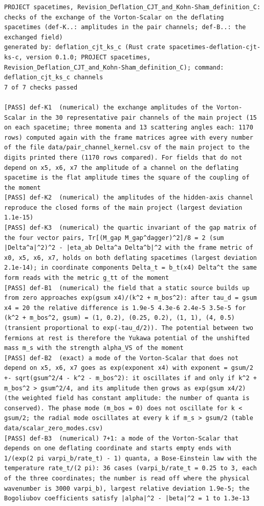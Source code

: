 \documentclass[
  10pt,
]{article}
\begin{document}
\begin{verbatim}
PROJECT spacetimes, Revision_Deflation_CJT_and_Kohn-Sham_definition_C: checks of the exchange of the Vorton-Scalar on the deflating spacetimes (def-K..: amplitudes in the pair channels; def-B..: the exchanged field)
generated by: deflation_cjt_ks_c (Rust crate spacetimes-deflation-cjt-ks-c, version 0.1.0; PROJECT spacetimes, Revision_Deflation_CJT_and_Kohn-Sham_definition_C); command: deflation_cjt_ks_c channels
7 of 7 checks passed

[PASS] def-K1  (numerical) the exchange amplitudes of the Vorton-Scalar in the 30 representative pair channels of the main project (15 on each spacetime; three momenta and 13 scattering angles each: 1170 rows) computed again with the frame matrices agree with every number of the file data/pair_channel_kernel.csv of the main project to the digits printed there (1170 rows compared). For fields that do not depend on x5, x6, x7 the amplitude of a channel on the deflating spacetime is the flat amplitude times the square of the coupling of the moment
[PASS] def-K2  (numerical) the amplitudes of the hidden-axis channel reproduce the closed forms of the main project (largest deviation 1.1e-15)
[PASS] def-K3  (numerical) the quartic invariant of the gap matrix of the four vector pairs, Tr[(M_gap M_gap^dagger)^2]/8 = 2 (sum |Delta^a|^2)^2 - |eta_ab Delta^a Delta^b|^2 with the frame metric of x0, x5, x6, x7, holds on both deflating spacetimes (largest deviation 2.1e-14); in coordinate components Delta_t = b_t(x4) Delta^t the same form reads with the metric g_tt of the moment
[PASS] def-B1  (numerical) the field that a static source builds up from zero approaches exp(gsum x4)/(k^2 + m_bos^2): after tau_d = gsum x4 = 20 the relative difference is 1.9e-5 4.3e-6 2.4e-5 3.5e-5 for (k^2 + m_bos^2, gsum) = (1, 0.2), (0.25, 0.2), (1, 1), (4, 0.5) (transient proportional to exp(-tau_d/2)). The potential between two fermions at rest is therefore the Yukawa potential of the unshifted mass m_s with the strength alpha_VS of the moment
[PASS] def-B2  (exact) a mode of the Vorton-Scalar that does not depend on x5, x6, x7 goes as exp(exponent x4) with exponent = gsum/2 +- sqrt(gsum^2/4 - k^2 - m_bos^2): it oscillates if and only if k^2 + m_bos^2 > gsum^2/4, and its amplitude then grows as exp(gsum x4/2) (the weighted field has constant amplitude: the number of quanta is conserved). The phase mode (m_bos = 0) does not oscillate for k < gsum/2; the radial mode oscillates at every k if m_s > gsum/2 (table data/scalar_zero_modes.csv)
[PASS] def-B3  (numerical) 7+1: a mode of the Vorton-Scalar that depends on one deflating coordinate and starts empty ends with 1/(exp(2 pi varpi_b/rate_t) - 1) quanta, a Bose-Einstein law with the temperature rate_t/(2 pi): 36 cases (varpi_b/rate_t = 0.25 to 3, each of the three coordinates; the number is read off where the physical wavenumber is 3000 varpi_b), largest relative deviation 1.9e-5; the Bogoliubov coefficients satisfy |alpha|^2 - |beta|^2 = 1 to 1.3e-13

\end{verbatim}
\end{document}
